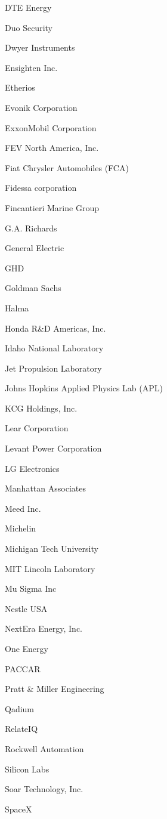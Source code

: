 \documentclass[twoside]{article}
\begin{document}
\begin{center}
\begin{multicols}{5}
\begin{FlushLeft}
\begin{compactitem}
\item DTE Energy
\item Duo Security
\item Dwyer Instruments
\item Ensighten Inc.
\item Etherios
\item Evonik Corporation
\item ExxonMobil Corporation
\item FEV North America, Inc.
\item Fiat Chrysler Automobiles (FCA)
\item Fidessa corporation
\item Fincantieri Marine Group
\item G.A. Richards
\item General Electric
\item GHD
\item Goldman Sachs
\item Halma
\item Honda R\&D Americas, Inc.
\item Idaho National Laboratory
\item Jet Propulsion Laboratory
\item Johns Hopkins Applied Physics Lab (APL)
\item KCG Holdings, Inc.
\item Lear Corporation
\item Levant Power Corporation
\item LG Electronics
\item Manhattan Associates
\item Meed Inc.
\item Michelin
\item Michigan Tech University
\item MIT Lincoln Laboratory
\item Mu Sigma Inc
\item Nestle USA
\item NextEra Energy, Inc.
\item One Energy
\item PACCAR
\item Pratt \& Miller Engineering
\item Qadium
\item RelateIQ
\item Rockwell Automation
\item Silicon Labs
\item Soar Technology, Inc.
\item SpaceX

\end{compactitem}
\end{FlushLeft}
\end{multicols}
\end{center}
\end{document}
